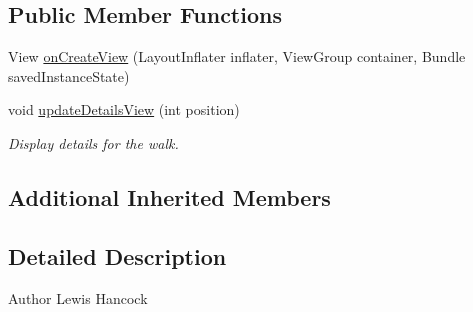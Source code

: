 \subsection*{Public Member Functions}
\begin{DoxyCompactItemize}
\item 
View \hyperlink{classuk_1_1ac_1_1swan_1_1digitaltrails_1_1fragments_1_1_my_walk_details_fragment_a2de2e058b1496f71a8595baf8aa62521}{on\+Create\+View} (Layout\+Inflater inflater, View\+Group container, Bundle saved\+Instance\+State)
\item 
void \hyperlink{classuk_1_1ac_1_1swan_1_1digitaltrails_1_1fragments_1_1_my_walk_details_fragment_aabc0f13013a905c581819a0052abdc1b}{update\+Details\+View} (int position)
\begin{DoxyCompactList}\small\item\em Display details for the walk. \end{DoxyCompactList}\end{DoxyCompactItemize}
\subsection*{Additional Inherited Members}


\subsection{Detailed Description}
\begin{DoxyAuthor}{Author}
Lewis Hancock 
\end{DoxyAuthor}


